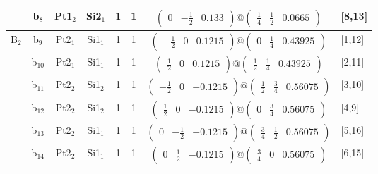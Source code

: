 \documentclass[fleqn,10pt,landscape]{article}
\begin{document}
\begin{itemize}
\begin{center}
\begin{longtable}{cc|cc|c|c|c|l}
& b$_{8}$ & Pt1$_{2}$ & Si2$_{1}$ & 1 & 1 & $\begin{pmatrix} 0 & - \frac{1}{2} & 0.133 \end{pmatrix}@\begin{pmatrix} \frac{1}{4} & \frac{1}{2} & 0.0665 \end{pmatrix}$ & [8,13] \\ \hline
B$_{2}$ & b$_{9}$ & Pt2$_{1}$ & Si1$_{1}$ & 1 & 1 & $\begin{pmatrix} - \frac{1}{2} & 0 & 0.1215 \end{pmatrix}@\begin{pmatrix} 0 & \frac{1}{4} & 0.43925 \end{pmatrix}$ & [1,12] \\
& b$_{10}$ & Pt2$_{1}$ & Si1$_{1}$ & 1 & 1 & $\begin{pmatrix} \frac{1}{2} & 0 & 0.1215 \end{pmatrix}@\begin{pmatrix} \frac{1}{2} & \frac{1}{4} & 0.43925 \end{pmatrix}$ & [2,11] \\
& b$_{11}$ & Pt2$_{2}$ & Si1$_{2}$ & 1 & 1 & $\begin{pmatrix} - \frac{1}{2} & 0 & -0.1215 \end{pmatrix}@\begin{pmatrix} \frac{1}{2} & \frac{3}{4} & 0.56075 \end{pmatrix}$ & [3,10] \\
& b$_{12}$ & Pt2$_{2}$ & Si1$_{2}$ & 1 & 1 & $\begin{pmatrix} \frac{1}{2} & 0 & -0.1215 \end{pmatrix}@\begin{pmatrix} 0 & \frac{3}{4} & 0.56075 \end{pmatrix}$ & [4,9] \\
& b$_{13}$ & Pt2$_{2}$ & Si1$_{1}$ & 1 & 1 & $\begin{pmatrix} 0 & - \frac{1}{2} & -0.1215 \end{pmatrix}@\begin{pmatrix} \frac{3}{4} & \frac{1}{2} & 0.56075 \end{pmatrix}$ & [5,16] \\
& b$_{14}$ & Pt2$_{2}$ & Si1$_{1}$ & 1 & 1 & $\begin{pmatrix} 0 & \frac{1}{2} & -0.1215 \end{pmatrix}@\begin{pmatrix} \frac{3}{4} & 0 & 0.56075 \end{pmatrix}$ & [6,15] \\

\end{longtable}
\end{center}
\end{itemize}
\end{document}
